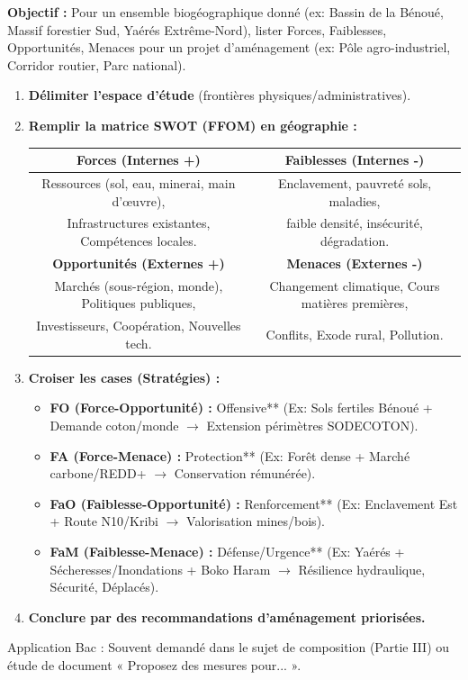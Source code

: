 \documentclass[11pt]{article}
\newcommand{\cle}[1]{{\popxbold\color{popdark}#1}}
\begin{document}
\begin{methode}
\textbf{Objectif :} Pour un ensemble biogéographique donné (ex: Bassin de la Bénoué, Massif forestier Sud, Yaérés Extrême-Nord), lister Forces, Faiblesses, Opportunités, Menaces pour un projet d'aménagement (ex: Pôle agro-industriel, Corridor routier, Parc national).
\begin{enumerate}
    \item \textbf{Délimiter l'espace d'étude} (frontières physiques/administratives).
    \item \textbf{Remplir la matrice SWOT (FFOM) en géographie :}
    \begin{center}
    \begin{tabular}{|c|c|}\hline
    \textbf{Forces (Internes +)} & \textbf{Faiblesses (Internes -)} \\ \hline
    Ressources (sol, eau, minerai, main d'œuvre), & Enclavement, pauvreté sols, maladies, \\
    Infrastructures existantes, Compétences locales. & faible densité, insécurité, dégradation. \\ \hline
    \textbf{Opportunités (Externes +)} & \textbf{Menaces (Externes -)} \\ \hline
    Marchés (sous-région, monde), Politiques publiques, & Changement climatique, Cours matières premières, \\
    Investisseurs, Coopération, Nouvelles tech. & Conflits, Exode rural, Pollution. \\ \hline
    \end{tabular}
    \end{center}
    \item \textbf{Croiser les cases (Stratégies) :}
    \begin{itemize}
        \item \textbf{FO (Force-Opportunité) : }Offensive** (Ex: Sols fertiles Bénoué + Demande coton/monde $\rightarrow$ Extension périmètres SODECOTON).
        \item \textbf{FA (Force-Menace) : }Protection** (Ex: Forêt dense + Marché carbone/REDD+ $\rightarrow$ Conservation rémunérée).
        \item \textbf{FaO (Faiblesse-Opportunité) : }Renforcement** (Ex: Enclavement Est + Route N10/Kribi $\rightarrow$ Valorisation mines/bois).
        \item \textbf{FaM (Faiblesse-Menace) : }Défense/Urgence** (Ex: Yaérés + Sécheresses/Inondations + Boko Haram $\rightarrow$ Résilience hydraulique, Sécurité, Déplacés).
    \end{itemize}
    \item \textbf{Conclure par des recommandations d'aménagement priorisées.}
\end{enumerate}
\cle{Application Bac} : Souvent demandé dans le sujet de composition (Partie III) ou étude de document « Proposez des mesures pour... ».
\end{methode}
\end{document}
